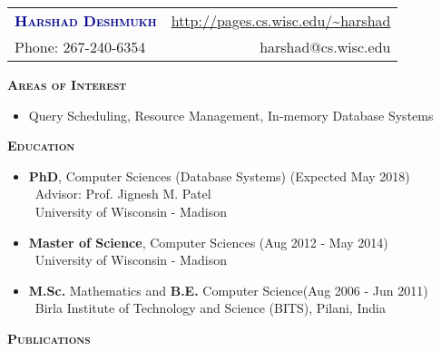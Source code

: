 \documentclass[11pt]{article}
\newcommand{\graybox}[1]{\begin{mdframed}[backgroundcolor=light-gray, linecolor=light-gray, roundcorner=10pt, shadow=false, shadowsize=1pt]
\Large{\textbf{\textsc{#1}}}
\end{mdframed}}
\begin{document}
\begin{flushleft}
\begin{tabular*}{\textwidth}{@{\extracolsep{\fill}}lr}%
{\LARGE{\textcolor{darkblue}{\textbf{\textsc{Harshad Deshmukh}}}}} & \url{http://pages.cs.wisc.edu/~harshad}\\
Phone: 267-240-6354 & harshad@cs.wisc.edu
\end{tabular*}
\end{flushleft}
\graybox{Areas of Interest}
\begin{itemize}\addtolength{\itemsep}{-0.5\baselineskip}
	\item[]Query Scheduling, Resource Management, In-memory Database Systems
\end{itemize}
\graybox{Education}
\begin{itemize}\addtolength{\itemsep}{-0.5\baselineskip}
\item{\textbf{PhD}, Computer Sciences (Database Systems) \hfill (Expected May 2018) }\\
	\textendash\ Advisor: Prof. Jignesh M. Patel\\
	\textendash\ University of Wisconsin - Madison
\item{\textbf{Master of Science}, Computer Sciences \hfill (Aug 2012 - May 2014) }\\
	\textendash\ University of Wisconsin - Madison
\item{\textbf{M.Sc.} Mathematics and \textbf{B.E.} Computer Science\hfill (Aug 2006 - Jun 2011) }\\
	\textendash\ Birla Institute of Technology and Science (BITS), Pilani, India
\end{itemize}
\graybox{Publications}
\end{document}
